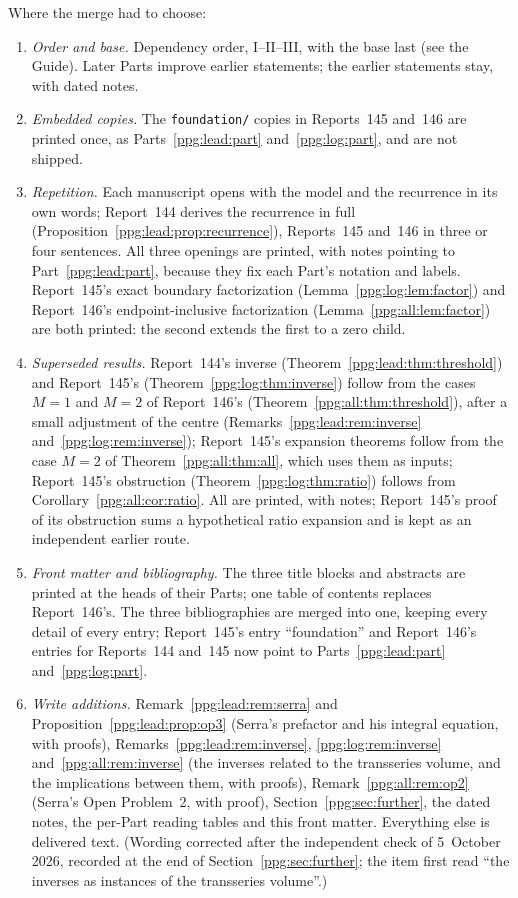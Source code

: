 \documentclass[11pt,letterpaper]{article}
\theoremstyle{remark}\newtheorem{remark}[theorem]{Remark}
\numberwithin{equation}{section}
\newcommand{\file}[1]{\nolinkurl{#1}}
\begin{document}
Where the merge had to choose:
\begin{enumerate}
\item \emph{Order and base.} Dependency order, I--II--III, with the base last (see the Guide). Later Parts improve earlier statements; the earlier statements stay, with dated notes.
\item \emph{Embedded copies.} The \file{foundation/} copies in Reports~145 and~146 are printed once, as Parts~\ref{ppg:lead:part} and~\ref{ppg:log:part}, and are not shipped.
\item \emph{Repetition.} Each manuscript opens with the model and the recurrence in its own words; Report~144 derives the recurrence in full (Proposition~\ref{ppg:lead:prop:recurrence}), Reports~145 and~146 in three or four sentences. All three openings are printed, with notes pointing to Part~\ref{ppg:lead:part}, because they fix each Part's notation and labels. Report~145's exact boundary factorization (Lemma~\ref{ppg:log:lem:factor}) and Report~146's endpoint-inclusive factorization (Lemma~\ref{ppg:all:lem:factor}) are both printed: the second extends the first to a zero child.
\item \emph{Superseded results.} Report~144's inverse (Theorem~\ref{ppg:lead:thm:threshold}) and Report~145's (Theorem~\ref{ppg:log:thm:inverse}) follow from the cases $M=1$ and $M=2$ of Report~146's (Theorem~\ref{ppg:all:thm:threshold}), after a small adjustment of the centre (Remarks~\ref{ppg:lead:rem:inverse} and~\ref{ppg:log:rem:inverse}); Report~145's expansion theorems follow from the case $M=2$ of Theorem~\ref{ppg:all:thm:all}, which uses them as inputs; Report~145's obstruction (Theorem~\ref{ppg:log:thm:ratio}) follows from Corollary~\ref{ppg:all:cor:ratio}. All are printed, with notes; Report~145's proof of its obstruction sums a hypothetical ratio expansion and is kept as an independent earlier route.
\item \emph{Front matter and bibliography.} The three title blocks and abstracts are printed at the heads of their Parts; one table of contents replaces Report~146's. The three bibliographies are merged into one, keeping every detail of every entry; Report~145's entry ``foundation'' and Report~146's entries for Reports~144 and~145 now point to Parts~\ref{ppg:lead:part} and~\ref{ppg:log:part}.
\item \emph{Write additions.} Remark~\ref{ppg:lead:rem:serra} and Proposition~\ref{ppg:lead:prop:op3} (Serra's prefactor and his integral equation, with proofs), Remarks~\ref{ppg:lead:rem:inverse}, \ref{ppg:log:rem:inverse} and~\ref{ppg:all:rem:inverse} (the inverses related to the transseries volume, and the implications between them, with proofs), Remark~\ref{ppg:all:rem:op2} (Serra's Open Problem~2, with proof), Section~\ref{ppg:sec:further}, the dated notes, the per-Part reading tables and this front matter. Everything else is delivered text. (Wording corrected after the independent check of 5~October 2026, recorded at the end of Section~\ref{ppg:sec:further}; the item first read ``the inverses as instances of the transseries volume''.)
\end{enumerate}
\end{document}
